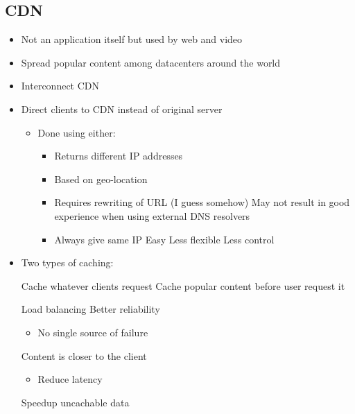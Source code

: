 \subsection{CDN}
\begin{itemize}
    \item Not an application itself but used by web and video
    \item Spread popular content among datacenters around the world
    \item Interconnect CDN
    \item Direct clients to CDN instead of original server
        \begin{itemize}
            \item Done using either:
                \begin{itemize}
                        \begin{itemize}
                            \item Returns different IP addresses
                            \item Based on geo-location
                            \item Requires rewriting of URL (I guess somehow)
                                \icon May not result in good experience when using external DNS resolvers
                        \end{itemize}
                        \begin{itemize}
                            \item Always give same IP
                            \ipro Easy
                            \icon Less flexible
                            \icon Less control
                        \end{itemize}
                \end{itemize}
        \end{itemize}
    \item Two types of caching:
        \begin{itemize}
             Cache whatever clients request
             Cache popular content before user request it
        \end{itemize}

    \ipro Load balancing
    \ipro Better reliability
        \begin{itemize}
            \item No single source of failure
        \end{itemize}
    \ipro Content is closer to the client
        \begin{itemize}
            \item Reduce latency
        \end{itemize}
    \ipro Speedup uncachable data
\end{itemize}
